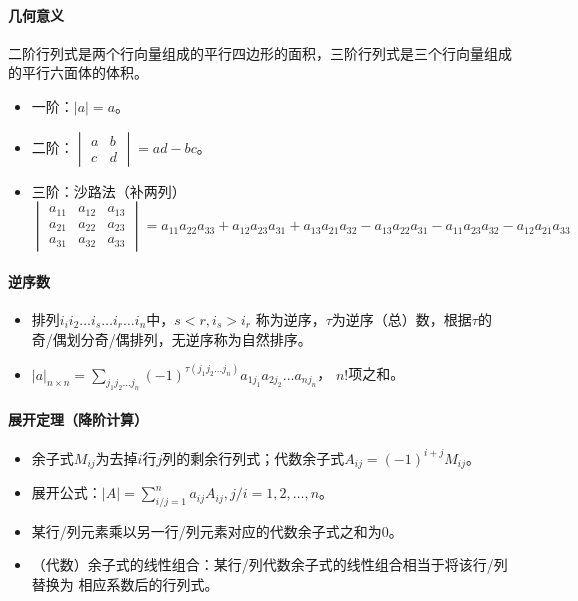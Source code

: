 \documentclass[
12pt, %
a4paper, 
oneside, %
headinclude,footinclude, %
]{scrartcl}
\begin{document}
\paragraph{几何意义}
二阶行列式是两个行向量组成的平行四边形的面积，三阶行列式是三个行向量组成的平行六面体的体积。
\begin{itemize}
\item 一阶：$ |a| = a $。
\item 二阶：$\begin{vmatrix} a & b \\ c & d \end{vmatrix} = ad - bc $。
\item 三阶：沙路法（补两列）
$$
\begin{vmatrix}
a_{11} & a_{12} & a_{13} \\
a_{21} & a_{22} & a_{23} \\
a_{31} & a_{32} & a_{33}
\end{vmatrix}
= a_{11}a_{22}a_{33} + a_{12}a_{23}a_{31} + a_{13}a_{21}a_{32} 
- a_{13}a_{22}a_{31} - a_{11}a_{23}a_{32} - a_{12}a_{21}a_{33}
$$
\end{itemize}
\paragraph{逆序数}
\begin{itemize}
\item 排列$ i_i i_2 \dots i_s \dots i_r \dots i_n $中，$ s < r, i_s > i_r $
称为逆序，$ \tau $为逆序（总）数，根据$ \tau $的奇/偶划分奇/偶排列，无逆序称为自然排序。
\item $ |a|_{n \times n} = \sum_{j_1 j_2 \dots j_n}(-1)^{\tau(j_1 j_2 \dots j_n)} a_{1 j_{1}} a_{2 j_{2}} \dots a_{n j_{n}} $，
$ n! $项之和。
\end{itemize}
\paragraph{展开定理（降阶计算）}
\begin{itemize}
\item 余子式$ M_{ij} $为去掉$ i $行$ j $列的剩余行列式；代数余子式$ A_{ij} = (-1)^{i+j} M_{ij} $。
\item 展开公式：$ |A| = \sum_{i/j = 1}^n a_{ij}A_{ij}, j/i = 1, 2, \dots, n $。
\item 某行/列元素乘以另一行/列元素对应的代数余子式之和为$ 0 $。
\item （代数）余子式的线性组合：某行/列代数余子式的线性组合相当于将该行/列替换为
相应系数后的行列式。
\end{itemize}
\end{document}
